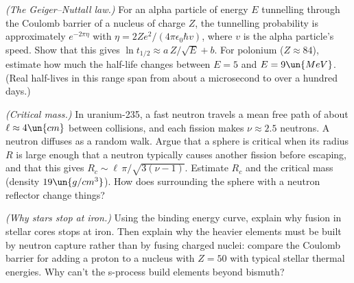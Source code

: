 \begin{problems}
\core \label{prob:geiger-nuttall} \emph{(The Geiger--Nuttall law.)} For an alpha particle of energy $E$ tunnelling through the Coulomb barrier of a nucleus of charge $Z$, the tunnelling probability is approximately $e^{-2\pi\eta}$ with $\eta = 2Ze^2/(4\pi\epsilon_0\hbar v)$, where $v$ is the alpha particle's speed. Show that this gives $\ln t_{1/2}\approx a\,Z/\sqrt E + b$. For polonium ($Z\approx84$), estimate how much the half-life changes between $E = 5$ and $E = 9\un{MeV}$. (Real half-lives in this range span from about a microsecond to over a hundred days.)

 \label{prob:critical} \emph{(Critical mass.)} In uranium-235, a fast neutron travels a mean free path of about $\ell\approx4\un{cm}$ between collisions, and each fission makes $\nu\approx2.5$ neutrons. A neutron diffuses as a random walk. Argue that a sphere is critical when its radius $R$ is large enough that a neutron typically causes another fission before escaping, and that this gives $R_c\sim\ell\,\pi/\sqrt{3(\nu-1)}$. Estimate $R_c$ and the critical mass (density $19\un{g/cm^3}$). How does surrounding the sphere with a neutron reflector change things?

 \emph{(Why stars stop at iron.)} Using the binding energy curve, explain why fusion in stellar cores stops at iron. Then explain why the heavier elements must be built by neutron capture rather than by fusing charged nuclei: compare the Coulomb barrier for adding a proton to a nucleus with $Z = 50$ with typical stellar thermal energies. Why can't the s-process build elements beyond bismuth?
\end{problems}

\begin{reading}
\end{reading}
